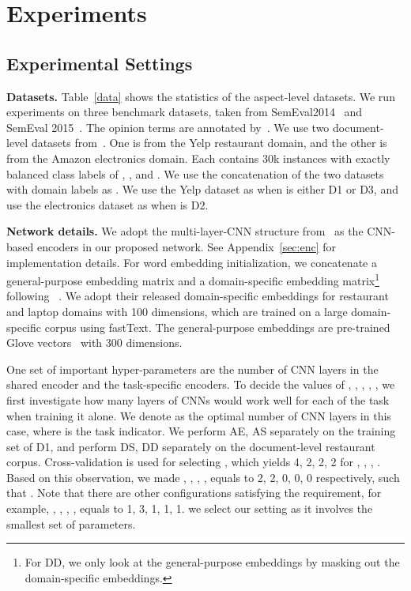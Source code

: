 \documentclass[11pt,a4paper]{article}
\begin{document}
\section{Experiments}
\subsection{Experimental Settings}
\textbf{Datasets.} Table~\ref{data} shows the statistics of the aspect-level datasets. We run experiments on three benchmark datasets, taken from SemEval2014~\citep{Pontiki:14} and SemEval 2015~\citep{Pontiki:15}. The opinion terms are annotated by~\citet{Wang:16b}. We use two document-level datasets from~\citep{He:18}. One is from the Yelp restaurant domain, and the other is from the Amazon electronics domain. Each contains 30k instances with exactly balanced class labels of , , and . We use the concatenation of the two datasets with domain labels as . We use the Yelp dataset as  when  is either D1 or D3, and use the electronics dataset as  when  is D2.
\medskip

\noindent\textbf{Network details.} We adopt the multi-layer-CNN structure from~\citep{hu:18} as the CNN-based encoders in our proposed network. See Appendix~\ref{sec:enc} for implementation details.  
For word embedding initialization, we concatenate a general-purpose embedding matrix and a domain-specific embedding matrix\footnote{For DD, we only look at the general-purpose embeddings by masking out the domain-specific embeddings.} following ~\citep{hu:18}. We adopt their released domain-specific embeddings for restaurant and laptop domains with 100 dimensions, which are trained on a large domain-specific corpus using fastText. The general-purpose embeddings are pre-trained Glove vectors~\citep{Pennington:14} with 300 dimensions. 

One set of important hyper-parameters are the number of CNN layers in the shared encoder and the task-specific encoders. To decide the values of , , , , , we first investigate how many layers of CNNs would work well for each of the task when training it alone. We denote  as the optimal number of CNN layers in this case, where  is the task indicator. We perform AE, AS separately on the training set of D1, and perform DS, DD separately on the document-level restaurant corpus. Cross-validation is used for selecting , which yields 4, 2, 2, 2 for , , , . Based on this observation, we made , , , ,  equals to 2, 2, 0, 0, 0 respectively, such that . Note that there are other configurations satisfying the requirement, for example, , , , ,  equals to 1, 3, 1, 1, 1. we select our setting as it involves the smallest set of parameters. 
\end{document}
